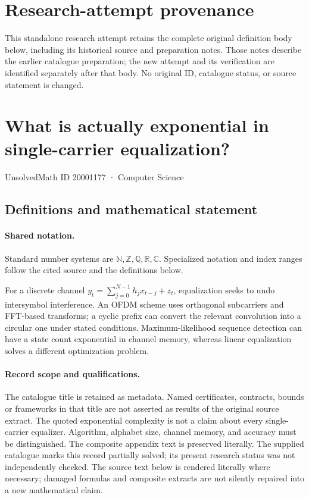 \documentclass[11pt]{article}
\begin{document}
\section*{Research-attempt provenance}
This standalone research attempt retains the complete original definition body below,
including its historical source and preparation notes. Those notes describe the
earlier catalogue preparation; the new attempt and its verification are identified
separately after that body. No original ID, catalogue status, or source statement is changed.

\section{What is actually exponential in single-carrier equalization?}\label{20001177}
{\small UnsolvedMath ID 20001177 · Computer Science}
\subsection{Definitions and mathematical statement}

\paragraph{Shared notation.}Standard number systems are $\mathbb N,\mathbb Z,\mathbb Q,\mathbb R,\mathbb C$. Specialized notation and index ranges follow the cited source and the definitions below.


For a discrete channel $y_t=\sum_{j=0}^{N-1}h_jx_{t-j}+z_t$, equalization seeks to undo intersymbol interference. An OFDM scheme uses orthogonal subcarriers and FFT-based transforms; a cyclic prefix can convert the relevant convolution into a circular one under stated conditions. Maximum-likelihood sequence detection can have a state count exponential in channel memory, whereas linear equalization solves a different optimization problem.
\paragraph{Record scope and qualifications.}
The catalogue title is retained as metadata. Named certificates, contracts, bounds or frameworks in that title are not asserted as results of the original source extract.
The quoted exponential complexity is not a claim about every single-carrier equalizer. Algorithm, alphabet size, channel memory, and accuracy must be distinguished. The composite appendix text is preserved literally. The supplied catalogue marks this record partially solved; its present research status was not independently checked.
The source text below is rendered literally where necessary; damaged formulas and composite extracts are not silently repaired into a new mathematical claim.
\end{document}

